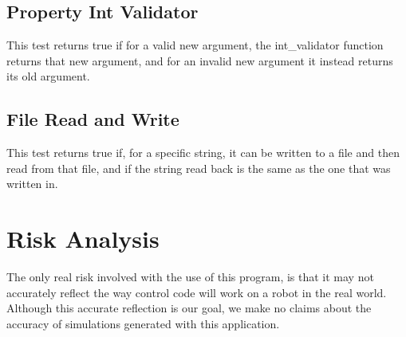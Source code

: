 \subsection{Property Int Validator}
This test returns true if for a valid new argument, the int\_validator function returns that new argument, and for an invalid new argument it instead returns its old argument.

\subsection{File Read and Write}
This test returns true if, for a specific string, it can be written to a file and then read from that file, and if the string read back is the same as the one that was written in.

\section{Risk Analysis}
The only real risk involved with the use of this program, is that it may not accurately reflect the way control code will work on a robot in the real world. Although this accurate reflection is our goal, we make no claims about the accuracy of simulations generated with this application.